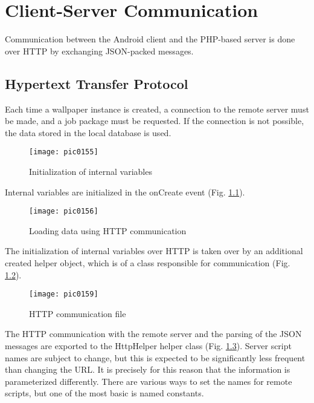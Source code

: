 \newpage
\chapter{Client-Server Communication}
\label{chapter06}

Communication between the Android client and the PHP-based server is done over HTTP by exchanging JSON-packed messages.

\section{Hypertext Transfer Protocol}

Each time a wallpaper instance is created, a connection to the remote server must be made, and a job package must be requested. If the connection is not possible, the data stored in the local database is used.

\begin{figure}[h]
\centering
\texttt{[image: pic0155]}
\caption{Initialization of internal variables}
\label{fig:pic0155}
\end{figure}
\FloatBarrier

Internal variables are initialized in the onCreate event (Fig. \ref{fig:pic0155}).

\begin{figure}[h]
\centering
\texttt{[image: pic0156]}
\caption{Loading data using HTTP communication}
\label{fig:pic0156}
\end{figure}
\FloatBarrier

The initialization of internal variables over HTTP is taken over by an additional created helper object, which is of a class responsible for communication (Fig. \ref{fig:pic0156}).

\begin{figure}[h]
\centering
\texttt{[image: pic0159]}
\caption{HTTP communication file}
\label{fig:pic0159}
\end{figure}
\FloatBarrier

The HTTP communication with the remote server and the parsing of the JSON messages are exported to the HttpHelper helper class (Fig. \ref{fig:pic0159}). Server script names are subject to change, but this is expected to be significantly less frequent than changing the URL. It is precisely for this reason that the information is parameterized differently. There are various ways to set the names for remote scripts, but one of the most basic is named constants.

